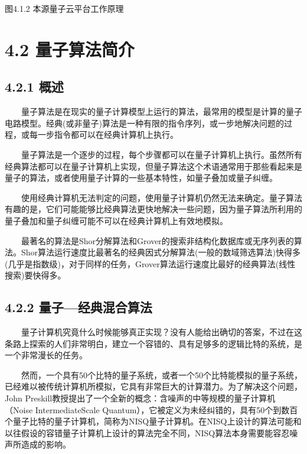 \documentclass[a4paper,11pt,english]{sphinxmanual}
\begin{document}

\begin{center}图4.1.2 本源量子云平台工作原理
\end{center}
\sphinxstepscope


\section{4.2 量子算法简介}
\label{\detokenize{rst/4.2_u91cf_u5b50_u7b97_u6cd5_u7b80_u4ecb:id1}}\label{\detokenize{rst/4.2_u91cf_u5b50_u7b97_u6cd5_u7b80_u4ecb::doc}}

\subsection{4.2.1 概述}
\label{\detokenize{rst/4.2_u91cf_u5b50_u7b97_u6cd5_u7b80_u4ecb:id2}}
\sphinxAtStartPar
  量子算法是在现实的量子计算模型上运行的算法，最常用的模型是计算的量子电路模型。经典(或非量子)算法是一种有限的指令序列，或一步地解决问题的过程，或每一步指令都可以在经典计算机上执行。

\sphinxAtStartPar
  量子算法是一个逐步的过程，每个步骤都可以在量子计算机上执行。虽然所有经典算法都可以在量子计算机上实现，但量子算法这个术语通常用于那些看起来是量子的算法，或者使用量子计算的一些基本特性，如量子叠加或量子纠缠。

\sphinxAtStartPar
  使用经典计算机无法判定的问题，使用量子计算机仍然无法来确定。量子算法有趣的是，它们可能能够比经典算法更快地解决一些问题，因为量子算法所利用的量子叠加和量子纠缠可能不可以在经典计算机上有效地模拟。

\sphinxAtStartPar
  最著名的算法是Shor分解算法和Grover的搜索非结构化数据库或无序列表的算法。Shor算法运行速度比最著名的经典因式分解算法(一般的数域筛选算法)快得多(几乎是指数级)，对于同样的任务，Grover算法运行速度比最好的经典算法(线性搜索)要快得多。


\subsection{4.2.2 量子—经典混合算法}
\label{\detokenize{rst/4.2_u91cf_u5b50_u7b97_u6cd5_u7b80_u4ecb:id3}}
\sphinxAtStartPar
  量子计算机究竟什么时候能够真正实现？没有人能给出确切的答案，不过在这条路上探索的人们非常明白，建立一个容错的、具有足够多的逻辑比特的系统，是一个非常漫长的任务。

\sphinxAtStartPar
  然而，一个具有50个比特的量子系统，或者一个50个比特能模拟的量子系统，已经难以被传统计算机所模拟，它具有非常巨大的计算潜力。为了解决这个问题，John Preskill教授提出了一个全新的概念：含噪声的中等规模的量子计算机（Noise Intermediate\sphinxhyphen{}Scale Quantum），它被定义为未经纠错的，具有50个到数百个量子比特的量子计算机，简称为NISQ量子计算机。在NISQ上设计的算法可能和以往假设的容错量子计算机上设计的算法完全不同，NISQ算法本身需要能容忍噪声所造成的影响。
\end{document}
